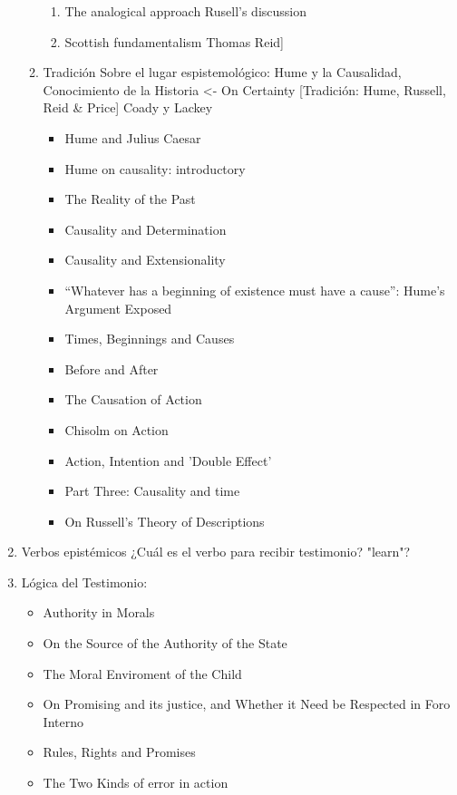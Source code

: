 \documentclass[11pt]{article}
\begin{document}
\begin{enumerate}
\begin{enumerate}
\begin{enumerate}
\item The analogical approach
\label{sec-4-1-3-4-1-3}
Rusell's discussion

\item Scottish fundamentalism
\label{sec-4-1-3-4-1-4}
Thomas Reid]
\end{enumerate}

\item Tradición Sobre el lugar espistemológico: Hume y la Causalidad, Conocimiento de la Historia <- On Certainty [Tradición: Hume, Russell, Reid \& Price] Coady y Lackey
\label{sec-4-1-3-4-2}
\begin{itemize}
\item Hume and Julius Caesar
\item Hume on causality: introductory
\item The Reality of the Past
\item Causality and Determination
\item Causality and Extensionality
\item “Whatever has a beginning of existence must have a cause”: Hume's Argument Exposed
\item Times, Beginnings and Causes
\item Before and After
\item The Causation of Action
\item Chisolm on Action
\item Action, Intention and 'Double Effect'
\item Part Three: Causality and time
\item On Russell's Theory of Descriptions
\end{itemize}
\end{enumerate}

\item Verbos epistémicos
\label{sec-4-1-3-5}
¿Cuál es el verbo para recibir testimonio?
"learn"?

\item Lógica del Testimonio:
\label{sec-4-1-3-6}
\begin{itemize}
\item Authority in Morals
\item On the Source of the Authority of the State
\item The Moral Enviroment of the Child
\item On Promising and its justice, and Whether it Need be Respected in Foro Interno
\item Rules, Rights and Promises
\item The Two Kinds of error in action
\end{itemize}


\end{enumerate}
\end{document}
